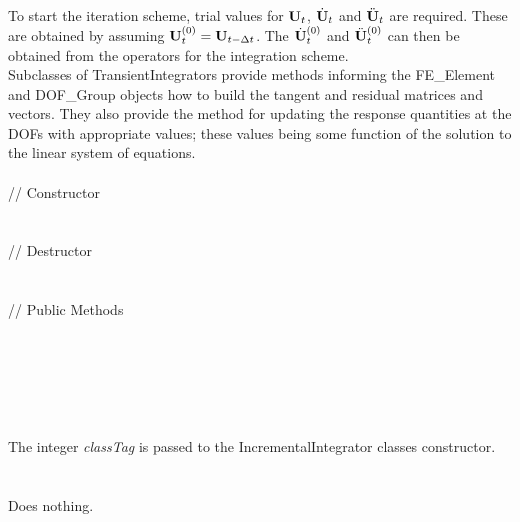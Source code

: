 To start the iteration scheme, trial values for ${\bf U}_{t}$, $\dot
{{\bf U}}_{t} $ and $\ddot {{\bf U}}_{t} $ are required. These are
obtained by assuming ${\bf U}_{t}^{(0)} = {\bf U}_{t-\Delta t}$. The
$\dot {{\bf U}}_{t}^{(0)} $ and $\ddot {{\bf U}}_{t}^{(0)}$
can then be obtained from the operators for the integration scheme. \\

Subclasses of TransientIntegrators provide
methods informing the FE\_Element and DOF\_Group objects how to build
the tangent and residual matrices and vectors. They also provide the
method for updating the response quantities at the DOFs with
appropriate values; these values being some function of the solution
to the linear system of equations. \\ 


 \\
\indent // Constructor \\
\\  \\
\indent // Destructor  \\ 
\\  \\
\indent // Public Methods \\
 \\
 \\
 \\
 \\

 \\
\\ 
The integer {\em classTag} is passed to the IncrementalIntegrator
classes constructor. \\

 \\
\\ 
Does nothing. \\

